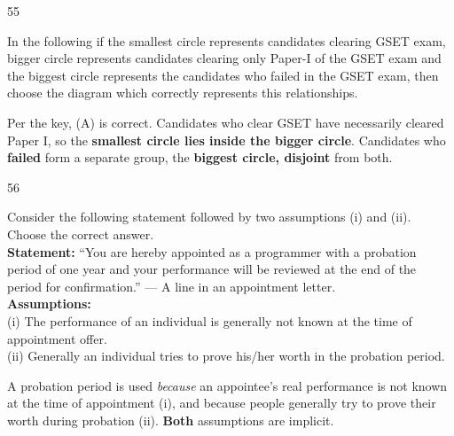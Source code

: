 \begin{question}{55}
{In the following if the smallest circle represents candidates clearing GSET exam, bigger circle represents candidates clearing only Paper-I of the GSET exam and the biggest circle represents the candidates who failed in the GSET exam, then choose the diagram which correctly represents this relationships.\par}
\begin{explain}
Per the key, (A) is correct. Candidates who clear GSET have necessarily cleared Paper I, so the \textbf{smallest circle lies inside the bigger circle}. Candidates who \textbf{failed} form a separate group, the \textbf{biggest circle, disjoint} from both.
\end{explain}
\end{question}

\begin{question}{56}
{Consider the following statement followed by two assumptions (i) and (ii). Choose the correct answer.\\
\textbf{Statement:} ``You are hereby appointed as a programmer with a probation period of one year and your performance will be reviewed at the end of the period for confirmation.'' --- A line in an appointment letter.\\
\textbf{Assumptions:}\\
(i) The performance of an individual is generally not known at the time of appointment offer.\\
(ii) Generally an individual tries to prove his/her worth in the probation period.\par}
\begin{explain}
A probation period is used \emph{because} an appointee's real performance is not known at the time of appointment (i), and because people generally try to prove their worth during probation (ii). \textbf{Both} assumptions are implicit.
\end{explain}
\end{question}

